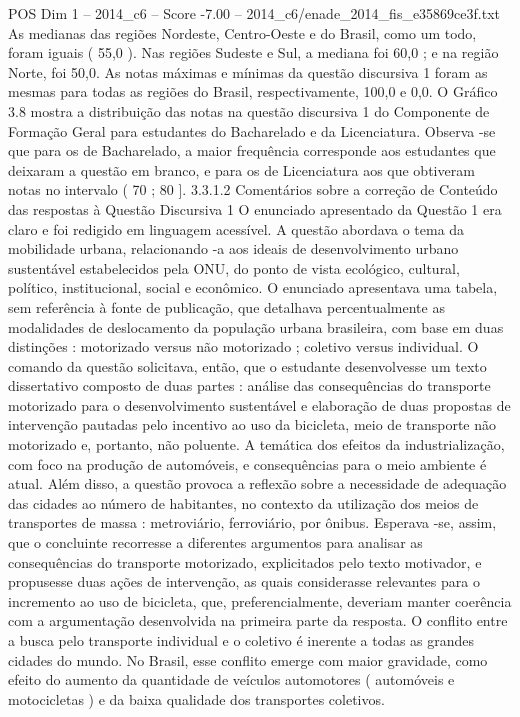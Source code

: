 \begin{textsample}{POS Dim 1 – 2014\_c6 – Score -7.00 – 2014\_c6/enade\_2014\_fis\_e35869ce3f.txt}
As medianas das regiões Nordeste, Centro-Oeste e do Brasil, como um todo, foram iguais ( 55,0 ).
Nas regiões Sudeste e Sul, a mediana foi 60,0 ; e na região Norte, foi 50,0.
As notas máximas e mínimas da questão discursiva 1 foram as mesmas para todas as regiões do Brasil, respectivamente, 100,0 e 0,0.
O Gráfico 3.8 mostra a distribuição das notas na questão discursiva 1 do Componente de Formação Geral para estudantes do Bacharelado e da Licenciatura.
Observa -se que para os de Bacharelado, a maior frequência corresponde aos estudantes que deixaram a questão em branco, e para os de Licenciatura aos que obtiveram notas no intervalo ( 70 ; 80 ]. 3.3.1.2 Comentários sobre a correção de Conteúdo das respostas à Questão Discursiva 1 O enunciado apresentado da Questão 1 era claro e foi redigido em linguagem acessível.
A questão abordava o tema da mobilidade urbana, relacionando -a aos ideais de desenvolvimento urbano sustentável estabelecidos pela ONU, do ponto de vista ecológico, cultural, político, institucional, social e econômico.
O enunciado apresentava uma tabela, sem referência à fonte de publicação, que detalhava percentualmente as modalidades de deslocamento da população urbana brasileira, com base em duas distinções : motorizado versus não motorizado ; coletivo versus individual.
O comando da questão solicitava, então, que o estudante desenvolvesse um texto dissertativo composto de duas partes : análise das consequências do transporte motorizado para o desenvolvimento sustentável e elaboração de duas propostas de intervenção pautadas pelo incentivo ao uso da bicicleta, meio de transporte não motorizado e, portanto, não poluente.
A temática dos efeitos da industrialização, com foco na produção de automóveis, e consequências para o meio ambiente é atual.
Além disso, a questão provoca a reflexão sobre a necessidade de adequação das cidades ao número de habitantes, no contexto da utilização dos meios de transportes de massa : metroviário, ferroviário, por ônibus.
Esperava -se, assim, que o concluinte recorresse a diferentes argumentos para analisar as consequências do transporte motorizado, explicitados pelo texto motivador, e propusesse duas ações de intervenção, as quais considerasse relevantes para o incremento ao uso de bicicleta, que, preferencialmente, deveriam manter coerência com a argumentação desenvolvida na primeira parte da resposta.
O conflito entre a busca pelo transporte individual e o coletivo é inerente a todas as grandes cidades do mundo.
No Brasil, esse conflito emerge com maior gravidade, como efeito do aumento da quantidade de veículos automotores ( automóveis e motocicletas ) e da baixa qualidade dos transportes coletivos.

\end{textsample}
